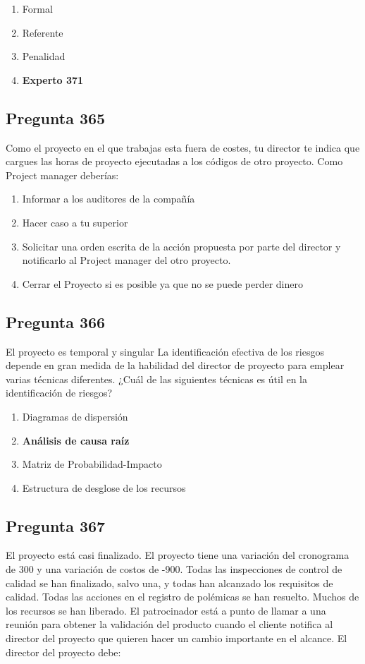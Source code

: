 \documentclass[11pt,a4paper]{article}
\begin{document}
\begin{enumerate}[label=\alph*)]
  \item Formal
  \item Referente
  \item Penalidad
  \item \textbf{Experto 371}
\end{enumerate}

\subsection*{Pregunta 365}
Como el proyecto en el que trabajas esta fuera de costes, tu director te indica que cargues las horas de proyecto ejecutadas a los códigos de otro proyecto. Como Project manager deberías:

\begin{enumerate}[label=\alph*)]
  \item Informar a los auditores de la compañía
  \item Hacer caso a tu superior
  \item Solicitar una orden escrita de la acción propuesta por parte del director y notificarlo al Project manager del otro proyecto.
  \item Cerrar el Proyecto si es posible ya que no se puede perder dinero
\end{enumerate}

\subsection*{Pregunta 366}
El proyecto es temporal y singular La identificación efectiva de los riesgos depende en gran medida de la habilidad del director de proyecto para emplear varias técnicas diferentes. ¿Cuál de las siguientes técnicas es útil en la identificación de riesgos?

\begin{enumerate}[label=\alph*)]
  \item Diagramas de dispersión
  \item \textbf{Análisis de causa raíz}
  \item Matriz de Probabilidad-Impacto
  \item Estructura de desglose de los recursos
\end{enumerate}

\subsection*{Pregunta 367}
El proyecto está casi finalizado. El proyecto tiene una variación del cronograma de 300 y una variación de costos de -900. Todas las inspecciones de control de calidad se han finalizado, salvo una, y todas han alcanzado los requisitos de calidad. Todas las acciones en el registro de polémicas se han resuelto. Muchos de los recursos se han liberado. El patrocinador está a punto de llamar a una reunión para obtener la validación del producto cuando el cliente notifica al director del proyecto que quieren hacer un cambio importante en el alcance. El director del proyecto debe:
\end{document}
